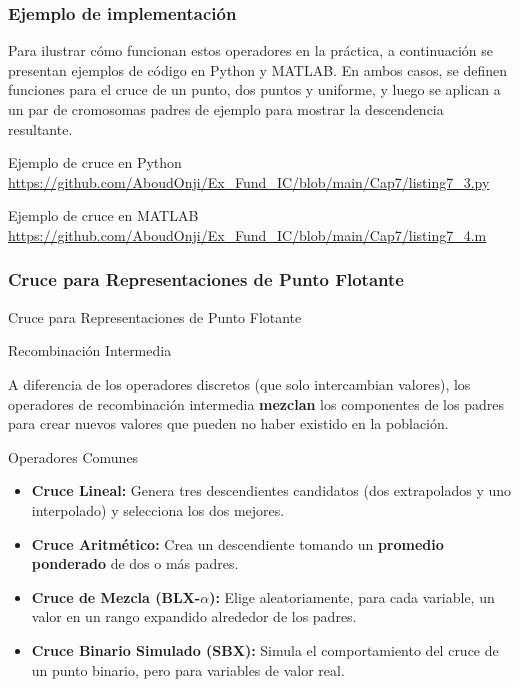 \documentclass[aspectratio=169,xcolor=dvipsnames]{beamer}
\begin{document}
\begin{frame}[fragile]
    \frametitle{Ejemplo de implementación}
    Para ilustrar cómo funcionan estos operadores en la práctica, a continuación se presentan ejemplos de código en Python y MATLAB. En ambos casos, se definen funciones para el cruce de un punto, dos puntos y uniforme, y luego se aplican a un par de cromosomas padres de ejemplo para mostrar la descendencia resultante.
    \begin{block}{Ejemplo de cruce en Python}
        \url{https://github.com/AboudOnji/Ex_Fund_IC/blob/main/Cap7/listing7_3.py}
    \end{block}
    \begin{block}{Ejemplo de cruce en MATLAB}
        \url{https://github.com/AboudOnji/Ex_Fund_IC/blob/main/Cap7/listing7_4.m}
    \end{block}
\end{frame}
\subsubsection{Cruce para Representaciones de Punto Flotante}

\begin{frame}{Cruce para Representaciones de Punto Flotante}
    \begin{block}{Recombinación Intermedia}
                        \footnotesize

    A diferencia de los operadores discretos (que solo intercambian valores), los operadores de recombinación intermedia \textbf{mezclan} los componentes de los padres para crear nuevos valores que pueden no haber existido en la población.
    \end{block}
    
    \begin{alertblock}{Operadores Comunes}
                        \footnotesize

        \begin{itemize}
            \item \textbf{Cruce Lineal:} Genera tres descendientes candidatos (dos extrapolados y uno interpolado) y selecciona los dos mejores.
            \pause
            \item \textbf{Cruce Aritmético:} Crea un descendiente tomando un \textbf{promedio ponderado} de dos o más padres.
            \pause
            \item \textbf{Cruce de Mezcla (BLX-$\alpha$):} Elige aleatoriamente, para cada variable, un valor en un rango expandido alrededor de los padres.
            \pause
            \item \textbf{Cruce Binario Simulado (SBX):} Simula el comportamiento del cruce de un punto binario, pero para variables de valor real.
        \end{itemize}
    \end{alertblock}
\end{frame}
\end{document}
